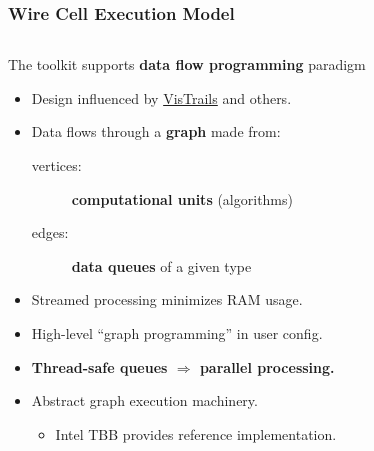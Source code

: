 \begin{frame}[fragile]
  \frametitle{Wire Cell Execution Model}

  \begin{columns}
    \begin{column}{0.7\textwidth}
      \footnotesize 
      The toolkit supports \textbf{data flow programming} paradigm
      \begin{itemize}
        \item Design influenced by
          \href{http://www0.bnl.gov/events/details.php?q=8932}{VisTrails} and others.
        \item Data flows through a \textbf{graph} made from:
          \begin{description}
          \item[vertices:] \textbf{computational units} (algorithms)
          \item[edges:] \textbf{data queues} of a given type
          \end{description}
        \item Streamed processing minimizes RAM usage.
        \item High-level ``graph programming'' in user config.
        \item \textbf{Thread-safe queues $\Rightarrow$ parallel processing.}
        \item Abstract graph execution machinery.
          \begin{itemize}\scriptsize
          \item Intel TBB provides reference implementation.
          \end{itemize}
        \end{itemize}
      \end{column}
      \begin{column}{0.3\textwidth}

        \vspace{-10mm}


\end{column}
\end{columns}
\end{frame}

